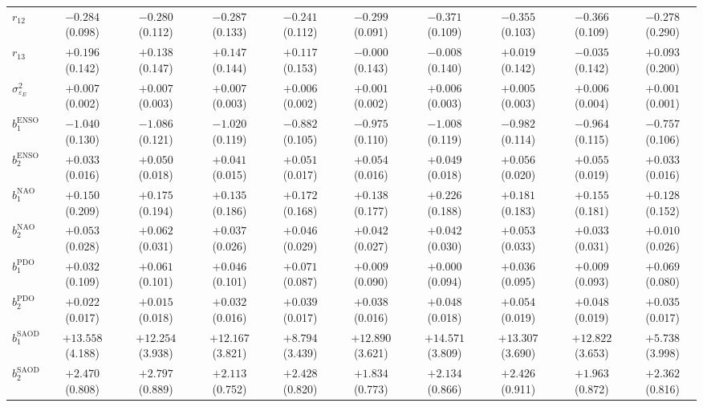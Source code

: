 \begin{landscape}
\begin{table}[p]
\begin{tabular}{lccccccccc}
    $r_{12}$ & $-0.284$ (0.098) & $-0.280$ (0.112) & $-0.287$ (0.133) & $-0.241$ (0.112) & $-0.299$ (0.091) & $-0.371$ (0.109) & $-0.355$ (0.103) & $-0.366$ (0.109) & $-0.278$ (0.290) \\
    $r_{13}$ & $+0.196$ (0.142) & $+0.138$ (0.147) & $+0.147$ (0.144) & $+0.117$ (0.153) & $-0.000$ (0.143) & $-0.008$ (0.140) & $+0.019$ (0.142) & $-0.035$ (0.142) & $+0.093$ (0.200) \\
    $\sigma^2_{\varepsilon_E}$ & $+0.007$ (0.002) & $+0.007$ (0.003) & $+0.007$ (0.003) & $+0.006$ (0.002) & $+0.001$ (0.002) & $+0.006$ (0.003) & $+0.005$ (0.003) & $+0.006$ (0.004) & $+0.001$ (0.001) \\
    $b_1^{\mathrm{ENSO}}$ & $-1.040$ (0.130) & $-1.086$ (0.121) & $-1.020$ (0.119) & $-0.882$ (0.105) & $-0.975$ (0.110) & $-1.008$ (0.119) & $-0.982$ (0.114) & $-0.964$ (0.115) & $-0.757$ (0.106) \\
    $b_2^{\mathrm{ENSO}}$ & $+0.033$ (0.016) & $+0.050$ (0.018) & $+0.041$ (0.015) & $+0.051$ (0.017) & $+0.054$ (0.016) & $+0.049$ (0.018) & $+0.056$ (0.020) & $+0.055$ (0.019) & $+0.033$ (0.016) \\
    $b_1^{\mathrm{NAO}}$ & $+0.150$ (0.209) & $+0.175$ (0.194) & $+0.135$ (0.186) & $+0.172$ (0.168) & $+0.138$ (0.177) & $+0.226$ (0.188) & $+0.181$ (0.183) & $+0.155$ (0.181) & $+0.128$ (0.152) \\
    $b_2^{\mathrm{NAO}}$ & $+0.053$ (0.028) & $+0.062$ (0.031) & $+0.037$ (0.026) & $+0.046$ (0.029) & $+0.042$ (0.027) & $+0.042$ (0.030) & $+0.053$ (0.033) & $+0.033$ (0.031) & $+0.010$ (0.026) \\
    $b_1^{\mathrm{PDO}}$ & $+0.032$ (0.109) & $+0.061$ (0.101) & $+0.046$ (0.101) & $+0.071$ (0.087) & $+0.009$ (0.090) & $+0.000$ (0.094) & $+0.036$ (0.095) & $+0.009$ (0.093) & $+0.069$ (0.080) \\
    $b_2^{\mathrm{PDO}}$ & $+0.022$ (0.017) & $+0.015$ (0.018) & $+0.032$ (0.016) & $+0.039$ (0.017) & $+0.038$ (0.016) & $+0.048$ (0.018) & $+0.054$ (0.019) & $+0.048$ (0.019) & $+0.035$ (0.017) \\
    $b_1^{\mathrm{SAOD}}$ & $+13.558$ (4.188) & $+12.254$ (3.938) & $+12.167$ (3.821) & $+8.794$ (3.439) & $+12.890$ (3.621) & $+14.571$ (3.809) & $+13.307$ (3.690) & $+12.822$ (3.653) & $+5.738$ (3.998) \\
    $b_2^{\mathrm{SAOD}}$ & $+2.470$ (0.808) & $+2.797$ (0.889) & $+2.113$ (0.752) & $+2.428$ (0.820) & $+1.834$ (0.773) & $+2.134$ (0.866) & $+2.426$ (0.911) & $+1.963$ (0.872) & $+2.362$ (0.816) \\

\end{tabular}
\end{table}
\end{landscape}
